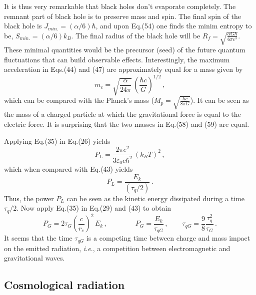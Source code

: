 \documentclass[a4]{epl2}
\begin{document}
It is thus very remarkable that black holes don't evaporate completely. The remnant part of black hole is to preserve mass and spin. The final spin of the black hole is $J_{min.}=(\alpha/6)\hbar$, and upon Eq.(54) one finds the minim entropy to be, $S_{min.}=(\alpha/6)k_B.$ The final radius of the black hole will be $R_f=\sqrt{\frac{\alpha G\hbar}{6\pi c^3}}$. These minimal quantities would be the precursor (seed) of the future quantum fluctuations that can build observable effects.
Interestingly, the maximum acceleration in Eqs.(44) and (47) are approximately equal for a mass given by
\begin{equation}
m_c=\sqrt{\frac{\alpha}{24\pi}}\,\left(\frac{\hbar c}{G}\right)^{1/2}\,,
\end{equation}
which can be compared with the Planck's mass ($M_p=\sqrt{\frac{\hbar c}{8\pi G}}$). It can be seen as the mass of a charged particle at which the gravitational force is equal to the electric force. It is surprising  that the two masses in Eq.(58) and (59) are equal.

Applying Eq.(35) in Eq.(26) yields
\begin{equation}
P_L=\frac{2\pi e^2}{3\varepsilon_0c\hbar^2}\,(k_BT)^2\,,
\end{equation}
which when compared with Eq.(43) yields
\begin{equation}
P_L=\frac{E_k}{(\tau_q/2)}\,.
\end{equation}
Thus, the power $P_L$ can be seen as the kinetic energy dissipated during a time $\tau_q/2$. Now apply Eq.(35) in Eq.(29) and (43)  to obtain
\begin{equation}
P_G=2\tau_G\left(\frac{c}{r_e}\right)^2\,E_k\,,\qquad\qquad P_G=\frac{E_k}{\tau_{qG}}\,,\qquad \tau_{qG}=\frac{9}{8}\frac{\tau_q^2}{\tau_G}\,.
\end{equation}
It seems that the time $\tau_{qG}$ is a competing time between charge and mass impact on the  emitted radiation, \emph{i.e}., a competition between electromagnetic and gravitational waves.

\subsection{\textcolor[rgb]{0.00,0.07,1.00}{Cosmological radiation}}
\end{document}
